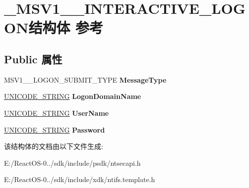 \hypertarget{struct___m_s_v1__0___i_n_t_e_r_a_c_t_i_v_e___l_o_g_o_n}{}\section{\+\_\+\+M\+S\+V1\+\_\+\_\+\+I\+N\+T\+E\+R\+A\+C\+T\+I\+V\+E\+\_\+\+L\+O\+G\+O\+N结构体 参考}
\label{struct___m_s_v1__0___i_n_t_e_r_a_c_t_i_v_e___l_o_g_o_n}
\subsection*{Public 属性}
\begin{DoxyCompactItemize}
\item 
\mbox{\label{struct___m_s_v1__0___i_n_t_e_r_a_c_t_i_v_e___l_o_g_o_n_ab7c3bfc83116bb4de7cb9ba22919e599}} 
M\+S\+V1\+\_\+\_\+\+L\+O\+G\+O\+N\+\_\+\+S\+U\+B\+M\+I\+T\+\_\+\+T\+Y\+PE {\bfseries Message\+Type}
\item 
\mbox{\label{struct___m_s_v1__0___i_n_t_e_r_a_c_t_i_v_e___l_o_g_o_n_ab90177d933d023f73552fce0b5139de7}} 
\hyperlink{struct___u_n_i_c_o_d_e___s_t_r_i_n_g}{U\+N\+I\+C\+O\+D\+E\+\_\+\+S\+T\+R\+I\+NG} {\bfseries Logon\+Domain\+Name}
\item 
\mbox{\label{struct___m_s_v1__0___i_n_t_e_r_a_c_t_i_v_e___l_o_g_o_n_a73cdf9ef20d4636f307f6677dfc6848c}} 
\hyperlink{struct___u_n_i_c_o_d_e___s_t_r_i_n_g}{U\+N\+I\+C\+O\+D\+E\+\_\+\+S\+T\+R\+I\+NG} {\bfseries User\+Name}
\item 
\mbox{\label{struct___m_s_v1__0___i_n_t_e_r_a_c_t_i_v_e___l_o_g_o_n_a0f672f52743f069013de47fa02f8aac7}} 
\hyperlink{struct___u_n_i_c_o_d_e___s_t_r_i_n_g}{U\+N\+I\+C\+O\+D\+E\+\_\+\+S\+T\+R\+I\+NG} {\bfseries Password}
\end{DoxyCompactItemize}


该结构体的文档由以下文件生成\+:\begin{DoxyCompactItemize}
\item 
E\+:/\+React\+O\+S-\/0../sdk/include/psdk/ntsecapi.\+h\item 
E\+:/\+React\+O\+S-\/0../sdk/include/xdk/ntifs.\+template.\+h\end{DoxyCompactItemize}
